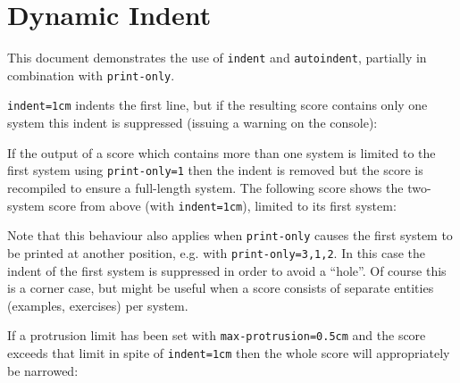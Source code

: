 \documentclass{scrartcl}
\begin{document}
\section*{Dynamic Indent}

This document demonstrates the use of \texttt{indent} and \texttt{autoindent},
partially in combination with \texttt{print-only}.

\texttt{indent=1cm} indents the first line, but if the resulting score contains
only one system this indent is suppressed (issuing a warning on the console):



If the output of a score which contains more than one system is limited to the
first system using \texttt{print-only=1} then the indent is removed but the
score is recompiled to ensure a full-length system. The following score shows
the two-system score from above (with \texttt{indent=1cm}), limited to its first
system:


Note that this behaviour also applies when \texttt{print-only} causes the first
system to be printed at another position, e.g. with \texttt{print-only={3,1,2}}.
In this case the indent of the first system is suppressed in order to avoid a
“hole”. Of course this is a corner case, but might be useful when a score
consists of separate entities (examples, exercises) per system.


If a protrusion limit has been set with \texttt{max-protrusion=0.5cm} and the
score exceeds that limit in spite of \texttt{indent=1cm} then the whole score
will appropriately be narrowed:

\end{document}
